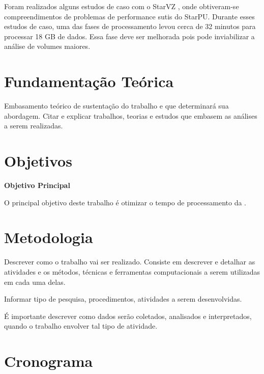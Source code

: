\documentclass[prop-esp]{iiufrgs}
\begin{document}
Foram realizados alguns estudos de caso com o StarVZ \cite{}, onde obtiveram-se compreendimentos de problemas de performance sutis do StarPU. Durante
esses estudos de caso, uma das fases de processamento levou cerca de 32 minutos para processar 18 GB de dados. Essa fase deve ser melhorada pois pode inviabilizar a análise de volumes maiores.


%
\chapter{Fundamentação Teórica}

Embasamento teórico de sustentação do trabalho e que determinará sua abordagem. Citar e explicar trabalhos, teorias e estudos que embasem as análises a serem realizadas. 


%
\chapter{Objetivos}

\noindent \textbf{Objetivo Principal} 

O principal objetivo deste trabalho é otimizar o tempo de processamento da .


%
\chapter{Metodologia}

Descrever como o trabalho vai ser realizado. Consiste em descrever e detalhar as atividades e os métodos, técnicas e ferramentas computacionais a serem utilizadas em cada uma delas. 

Informar tipo de pesquisa, procedimentos, atividades a serem desenvolvidas.

É importante descrever como dados serão coletados, analisados e interpretados, quando o trabalho envolver tal tipo de atividade.

%
\chapter{Cronograma}
\end{document}
